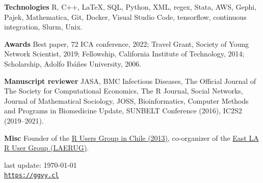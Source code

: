 \documentclass[letterpaper, 9pt]{article}
\newcommand{\myorange}{myteal!70!black}
\renewcommand{\textbf}[1]{{\bfseries\color{\myorange}#1}}
\def\footerlink{https://ggvy.cl}
\renewenvironment{itemize}{
  \begin{list}{}{
    \setlength{\leftmargin}{0.3cm}
  }
}{
  \end{list}
}
\begin{document}
\begin{itemize}
\item \textbf{Technologies} R, C++, \LaTeX, SQL, Python, XML, regex, Stata, AWS, Gephi, Pajek, Mathematica, Git, Docker, Visual Studio Code, tensorflow, continuous integration, Slurm, Unix.
\item \textbf{Awards} Best paper, 72 ICA conference, 2022; Travel Grant, Society of Young Network Scientist, 2019; Fellowship, California Institute of Technology, 2014; Scholarship, Adolfo Ib\'a\~nes University, 2006.
\item \textbf{Manuscript reviewer} JASA, BMC Infectious Diseases, The Official Journal of The Society for Computational Economics, The R Journal, Social Networks, Journal of Mathematical Sociology, JOSS, Bioinformatics, Computer Methods and Programs in Biomedicine Update, SUNBELT Conference (2016), IC2S2 (2019--2021).
\item \textbf{Misc} Founder of the \href{https://www.meetup.com/useRchile/}{R Users Group in Chile (2013)}, co-organizer of the \href{https://socalr.org}{East LA R User Group (LAERUG)}.
\end{itemize}

\begin{center}
 \begin{footnotesize}
   last update: \today \\
   \href{\footerlink}{\texttt{\footerlink}}
 \end{footnotesize}
\end{center}
\end{document}
